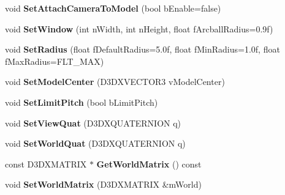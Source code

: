 \begin{DoxyCompactItemize}
\item 
\hypertarget{class_c_model_viewer_camera_acb49faefb46c891fcbf9f96529d96c19}{void {\bfseries Set\+Attach\+Camera\+To\+Model} (bool b\+Enable=false)}\label{class_c_model_viewer_camera_acb49faefb46c891fcbf9f96529d96c19}

\item 
\hypertarget{class_c_model_viewer_camera_aa3602c760615115aa606cc3dfe9675fc}{void {\bfseries Set\+Window} (int n\+Width, int n\+Height, float f\+Arcball\+Radius=0.\+9f)}\label{class_c_model_viewer_camera_aa3602c760615115aa606cc3dfe9675fc}

\item 
\hypertarget{class_c_model_viewer_camera_ae86762ee234412b6a0947b791d7be2d3}{void {\bfseries Set\+Radius} (float f\+Default\+Radius=5.\+0f, float f\+Min\+Radius=1.\+0f, float f\+Max\+Radius=\+F\+L\+T\+\_\+\+M\+A\+X)}\label{class_c_model_viewer_camera_ae86762ee234412b6a0947b791d7be2d3}

\item 
\hypertarget{class_c_model_viewer_camera_ae1511eb18ef5ec36904ba2f6819e26f2}{void {\bfseries Set\+Model\+Center} (D3\+D\+X\+V\+E\+C\+T\+O\+R3 v\+Model\+Center)}\label{class_c_model_viewer_camera_ae1511eb18ef5ec36904ba2f6819e26f2}

\item 
\hypertarget{class_c_model_viewer_camera_adccbf68ed56b3d7204366dd8702912b4}{void {\bfseries Set\+Limit\+Pitch} (bool b\+Limit\+Pitch)}\label{class_c_model_viewer_camera_adccbf68ed56b3d7204366dd8702912b4}

\item 
\hypertarget{class_c_model_viewer_camera_a66a842563bb9078bfa641bf6f1190818}{void {\bfseries Set\+View\+Quat} (D3\+D\+X\+Q\+U\+A\+T\+E\+R\+N\+I\+O\+N q)}\label{class_c_model_viewer_camera_a66a842563bb9078bfa641bf6f1190818}

\item 
\hypertarget{class_c_model_viewer_camera_a48515af5127c1647621df308171d72d4}{void {\bfseries Set\+World\+Quat} (D3\+D\+X\+Q\+U\+A\+T\+E\+R\+N\+I\+O\+N q)}\label{class_c_model_viewer_camera_a48515af5127c1647621df308171d72d4}

\item 
\hypertarget{class_c_model_viewer_camera_adf18f000e0d304a5172424ad4151ddb6}{const D3\+D\+X\+M\+A\+T\+R\+I\+X $\ast$ {\bfseries Get\+World\+Matrix} () const }\label{class_c_model_viewer_camera_adf18f000e0d304a5172424ad4151ddb6}

\item 
\hypertarget{class_c_model_viewer_camera_ab5316accb7dfb3fd30a98f2647cedca0}{void {\bfseries Set\+World\+Matrix} (D3\+D\+X\+M\+A\+T\+R\+I\+X \&m\+World)}\label{class_c_model_viewer_camera_ab5316accb7dfb3fd30a98f2647cedca0}

\end{DoxyCompactItemize}
